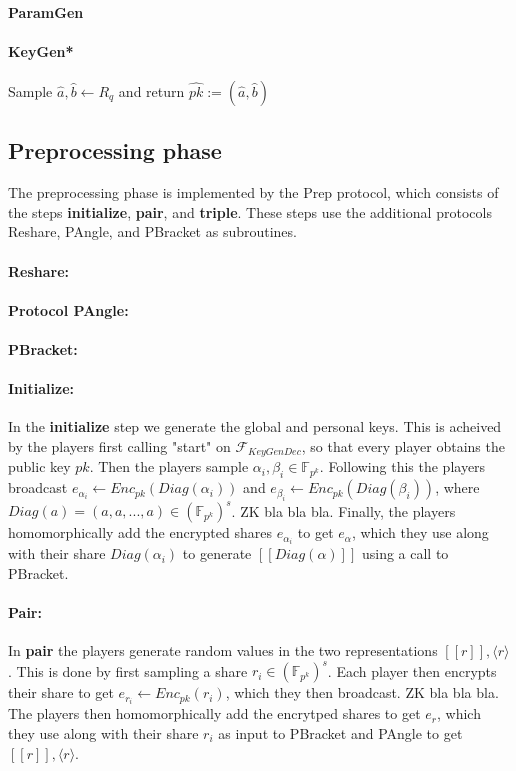 \documentclass{article}
\begin{document}
\paragraph{ParamGen}


\paragraph{KeyGen*}
Sample $\widehat{a}, \widehat{b} \leftarrow R_q$ and return $\widehat{pk} := (\widehat{a}, \widehat{b})$

\newpage
\subsection{Preprocessing phase} \label{Prep}
The preprocessing phase is implemented by the Prep protocol, which consists of the steps \textbf{initialize}, \textbf{pair}, and \textbf{triple}. These steps use the additional protocols Reshare, PAngle, and PBracket as subroutines.
\paragraph{Reshare:}
\paragraph{Protocol PAngle:}
\paragraph{PBracket:}
\paragraph{Initialize:}
In the \textbf{initialize} step we generate the global and personal keys. This is acheived by the players first calling "start" on $\mathcal{F}_{KeyGenDec}$, so that every player obtains the public key $pk$.
Then the players sample $\alpha_i , \beta_i \in \mathbb{F}_{p^k}$.
Following this the players broadcast $e_{\alpha_i} \leftarrow Enc_{pk}(Diag(\alpha_i))$ and $e_{\beta_i} \leftarrow Enc_{pk}(Diag(\beta_i))$, where $Diag(a) = (a, a, ..., a) \in (\mathbb{F}_{p^k})^s$. ZK bla bla bla.
Finally, the players homomorphically add the encrypted shares $e_{\alpha_i}$ to get $e_\alpha$, which they use along with their share $Diag(\alpha_i)$ to generate $[\![ Diag(\alpha) ]\!]$ using a call to PBracket.

\paragraph{Pair:}
In \textbf{pair} the players generate random values in the two representations $[\![ r ]\!], \langle r \rangle$. This is done by first sampling a share $r_i \in (\mathbb{F}_{p^k})^s$. Each player then encrypts their share to get $e_{r_i} \leftarrow Enc_{pk}(r_i)$, which they then broadcast. ZK bla bla bla.
The players then homomorphically add the encrytped shares to get $e_r$, which they use along with their share $r_i$ as input to PBracket and PAngle to get $[\![ r ]\!], \langle r \rangle$.
\end{document}
